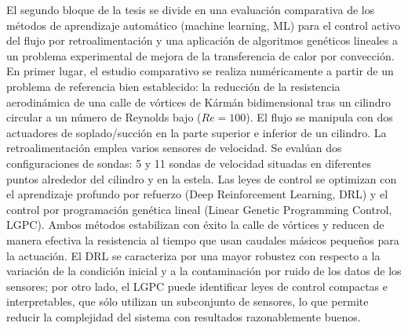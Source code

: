 \begin{abstrakt}
    El segundo bloque de la tesis se divide en una evaluación comparativa de los métodos de aprendizaje automático (machine learning, ML) para el control activo del flujo por retroalimentación y una aplicación de algoritmos genéticos lineales a un problema experimental de mejora de la transferencia de calor por convección. En primer lugar, el estudio comparativo se realiza numéricamente a partir de un problema de referencia bien establecido: la reducción de la resistencia aerodinámica de una calle de vórtices de Kármán bidimensional tras un cilindro circular a un número de Reynolds bajo ($Re=100$). El flujo se manipula con dos actuadores de soplado/succión en la parte superior e inferior de un cilindro. La retroalimentación emplea varios sensores de velocidad. Se evalúan dos configuraciones de sondas: 5 y 11 sondas de velocidad situadas en diferentes puntos alrededor del cilindro y en la estela. Las leyes de control se optimizan con el aprendizaje profundo por refuerzo (Deep Reinforcement Learning, DRL) y el control por programación genética lineal (Linear Genetic Programming Control, LGPC). Ambos métodos estabilizan con éxito la calle de vórtices y reducen de manera efectiva la resistencia al tiempo que usan caudales másicos pequeños para la actuación. El DRL se caracteriza por una mayor robustez con respecto a la variación de la condición inicial y a la contaminación por ruido de los datos de los sensores; por otro lado, el LGPC puede identificar leyes de control compactas e interpretables, que sólo utilizan un subconjunto de sensores, lo que permite reducir la complejidad del sistema con resultados razonablemente buenos.


\end{abstrakt}
